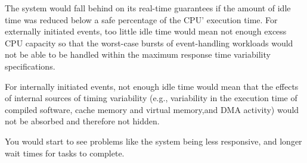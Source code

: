 The system would fall behind on its real-time guarantees if the amount of idle
time was reduced below a safe percentage of the CPU' execution time. For
externally initiated events, too little idle time would mean not enough excess
CPU capacity so that the worst-case bursts of event-handling workloads would not
be able to be handled within the maximum response time variability
specifications. 

For internally initiated events, not enough idle time would mean that the
effects of internal sources of timing variability (e.g., variability in the
execution time of compiled software, cache memory and virtual memory,and DMA
activity) would not be absorbed and therefore not hidden. 

You would start to see problems like the system being less responsive, and
longer wait times for tasks to complete.
